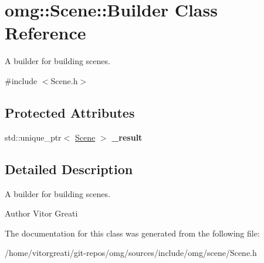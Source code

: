 \hypertarget{classomg_1_1_scene_1_1_builder}{}\section{omg\+::Scene\+::Builder Class Reference}
\label{classomg_1_1_scene_1_1_builder}


A builder for building scenes.  




{\ttfamily \#include $<$Scene.\+h$>$}

\subsection*{Protected Attributes}
\begin{DoxyCompactItemize}
\item 
\mbox{\label{classomg_1_1_scene_1_1_builder_a40bc06610c26b82adb37b4b7073d26da}} 
std\+::unique\+\_\+ptr$<$ \mbox{\hyperlink{classomg_1_1_scene}{Scene}} $>$ {\bfseries \+\_\+result}
\end{DoxyCompactItemize}


\subsection{Detailed Description}
A builder for building scenes. 

\begin{DoxyAuthor}{Author}
Vitor Greati 
\end{DoxyAuthor}


The documentation for this class was generated from the following file\+:\begin{DoxyCompactItemize}
\item 
/home/vitorgreati/git-\/repos/omg/sources/include/omg/scene/Scene.\+h\end{DoxyCompactItemize}
